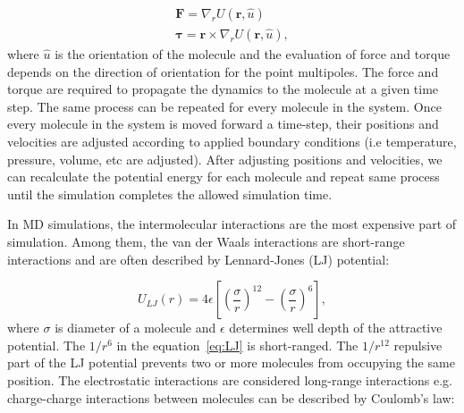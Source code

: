 \begin{subequations}
\begin{gather}
\mathbf F = \nabla_r U(\mathbf r, \hat{u}) \\
\mathbf {\mathbf{\tau}} = \mathbf r \times \nabla_r U(\mathbf r, \hat{u}),
\end{gather}
\label{eq:forceTorque}
\end{subequations}
where $\hat{u}$ is the orientation of the molecule and the evaluation of force and torque depends on the direction of orientation for the point multipoles. The force and torque are required to propagate the dynamics to the molecule at a given time step. The same process can be repeated for every molecule in the system. Once every molecule in the system is moved forward a time-step, their positions and velocities are adjusted according to applied boundary conditions (i.e temperature, pressure, volume, etc are adjusted). After adjusting positions and velocities, we can recalculate the potential energy for each molecule and repeat same process until the simulation completes the allowed simulation time.
 
In MD simulations, the intermolecular interactions are the most expensive part of simulation. Among them, the van der Waals interactions are short-range interactions and are often described by Lennard-Jones (LJ) potential:

\begin{equation}
U_{LJ}(r) = 4\epsilon \left[\left(\frac{\sigma}{r} \right)^{12} - \left(\frac{\sigma}{r} \right)^6\right],
\label{eq:LJ}
\end{equation}
where $\sigma$ is diameter of a molecule and $\epsilon$ determines well depth of the attractive potential. The $1/r^6$ in the equation~\ref{eq:LJ} is short-ranged. The $1/r^{12}$ repulsive part of the  LJ potential prevents two or more molecules from occupying the same position. The electrostatic interactions are considered long-range interactions e.g. charge-charge interactions between molecules can be described by Coulomb's law: 

